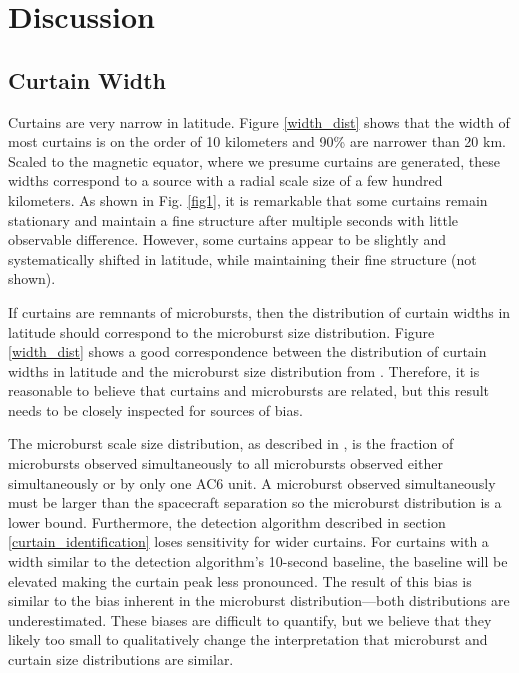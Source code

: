 \documentclass[draft]{agujournal2019}
\begin{document}
\section{Discussion} \label{discussion}
\subsection{Curtain Width}
Curtains are very narrow in latitude. Figure \ref{width_dist} shows that the width of most curtains is on the order of 10 kilometers and 90\% are narrower than 20 km. Scaled to the magnetic equator, where we presume curtains are generated, these widths correspond to a source with a radial scale size of a few hundred kilometers. As shown in Fig. \ref{fig1}, it is remarkable that some curtains remain stationary and maintain a fine structure after multiple seconds with little observable difference. However, some curtains appear to be slightly and systematically shifted in latitude, while maintaining their fine structure (not shown).

If curtains are remnants of microbursts, then the distribution of curtain widths in latitude should correspond to the microburst size distribution. Figure \ref{width_dist} shows a good correspondence between the distribution of curtain widths in latitude and the microburst size distribution from . Therefore, it is reasonable to believe that curtains and microbursts are related, but this result needs to be closely inspected for sources of bias. 

The microburst scale size distribution, as described in , is the fraction of microbursts observed simultaneously to all microbursts observed either simultaneously or by only one AC6 unit. A microburst observed simultaneously must be larger than the spacecraft separation so the microburst distribution is a lower bound. Furthermore, the detection algorithm described in section \ref{curtain_identification} loses sensitivity for wider curtains. For curtains with a width similar to the detection algorithm’s 10-second baseline, the baseline will be elevated making the curtain peak less pronounced. The result of this bias is similar to the bias inherent in the microburst distribution---both distributions are underestimated. These biases are difficult to quantify, but we believe that they likely too small to qualitatively change the interpretation that microburst and curtain size distributions are similar.
\end{document}
